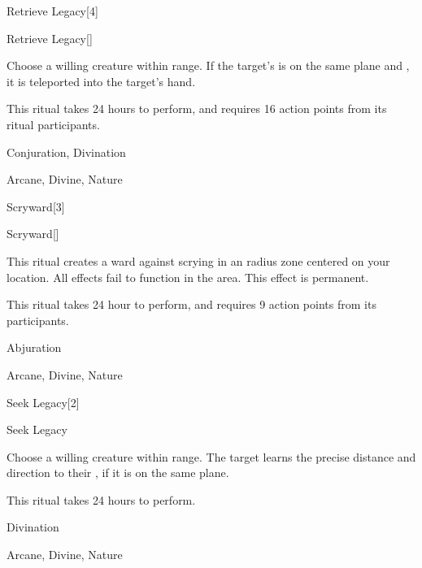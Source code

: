 \begin{spellsection}{Retrieve Legacy}[4]


\begin{ability}{Retrieve Legacy}[]

Choose a willing creature within \rngclose range.
If the target's  is on the same plane and , it is teleported into the target's hand.

This ritual takes 24 hours to perform, and requires 16 action points from its ritual participants.

\end{ability}




 Conjuration, Divination

 Arcane, Divine, Nature
\end{spellsection}


\begin{spellsection}{Scryward}[3]


\begin{ability}{Scryward}[]

This ritual creates a ward against scrying in an \arealarge radius zone centered on your location.
All  effects fail to function in the area.
This effect is permanent.

This ritual takes 24 hour to perform, and requires 9 action points from its participants.

\end{ability}




 Abjuration

 Arcane, Divine, Nature
\end{spellsection}


\begin{spellsection}{Seek Legacy}[2]


\begin{ability}{Seek Legacy}

Choose a willing creature within \rngclose range.
The target learns the precise distance and direction to their , if it is on the same plane.

This ritual takes 24 hours to perform.

\end{ability}




 Divination

 Arcane, Divine, Nature
\end{spellsection}


